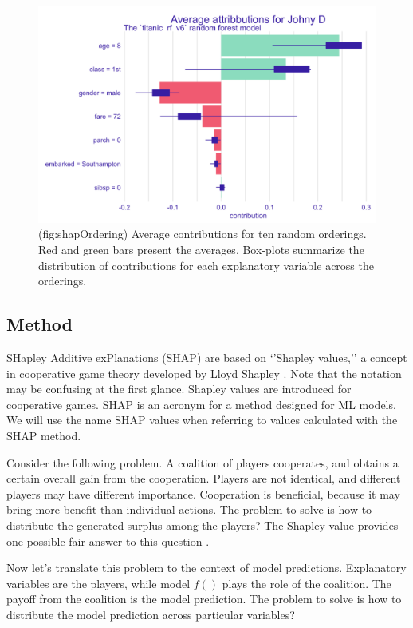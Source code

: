\documentclass[12pt,]{krantz}
\begin{document}
\begin{figure}

{\centering \includegraphics[width=0.7\linewidth]{figure/shap_ordering} 

}

\caption{(fig:shapOrdering) Average contributions for ten random orderings. Red and green bars present the averages. Box-plots summarize the distribution of contributions for each explanatory variable across the orderings.}\label{fig:shapOrdering}
\end{figure}

\hypertarget{SHAPMethod}{%
\subsection{Method}\label{SHAPMethod}}

SHapley Additive exPlanations (SHAP) are based on `'Shapley values,'' a concept in cooperative game theory developed by Lloyd Shapley \citep{shapleybook1952}. Note that the notation may be confusing at the first glance. Shapley values are introduced for cooperative games. SHAP is an acronym for a method designed for ML models. We will use the name SHAP values when referring to values calculated with the SHAP method.

Consider the following problem. A coalition of players cooperates, and obtains a certain overall gain from the cooperation. Players are not identical, and different players may have different importance. Cooperation is beneficial, because it may bring more benefit than individual actions. The problem to solve is how to distribute the generated surplus among the players? The Shapley value provides one possible fair answer to this question \citep{shapleybook1952}.

Now let's translate this problem to the context of model predictions. Explanatory variables are the players, while model \(f()\) plays the role of the coalition. The payoff from the coalition is the model prediction. The problem to solve is how to distribute the model prediction across particular variables?
\end{document}
